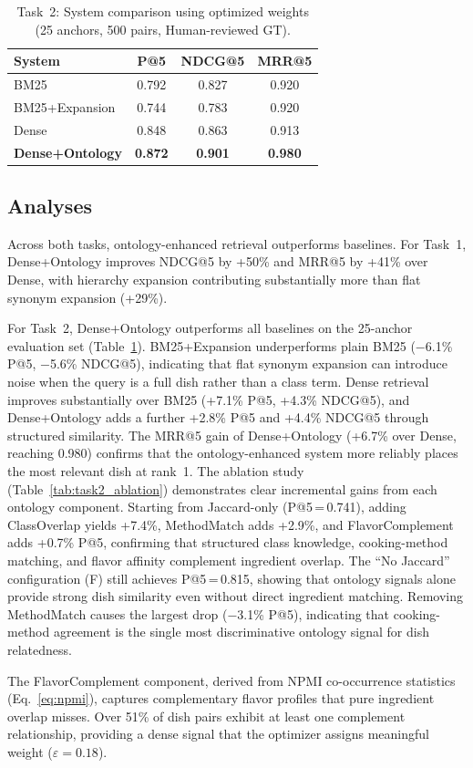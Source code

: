 \begin{table}[t]
\centering
\caption{Task~2: System comparison using optimized weights (25 anchors, 500 pairs, Human-reviewed GT).}
\label{tab:task2}
\begin{tabular}{lccc}
\toprule
\textbf{System} & \textbf{P@5} & \textbf{NDCG@5} & \textbf{MRR@5} \\
\midrule
BM25                         & 0.792 & 0.827 & 0.920 \\
BM25+Expansion               & 0.744 & 0.783 & 0.920 \\
Dense                        & 0.848 & 0.863 & 0.913 \\
\textbf{Dense+Ontology}      & \textbf{0.872} & \textbf{0.901} & \textbf{0.980} \\
\bottomrule
\end{tabular}
\end{table}

\subsection{Analyses}

Across both tasks, ontology-enhanced retrieval outperforms baselines. For Task~1, Dense+Ontology improves NDCG@5 by +50\% and MRR@5 by +41\% over Dense, with hierarchy expansion contributing substantially more than flat synonym expansion (+29\%).

For Task~2, Dense+Ontology outperforms all baselines on the 25-anchor evaluation set (Table~\ref{tab:task2}). BM25+Expansion underperforms plain BM25 ($-$6.1\% P@5, $-$5.6\% NDCG@5), indicating that flat synonym expansion can introduce noise when the query is a full dish rather than a class term. Dense retrieval improves substantially over BM25 (+7.1\% P@5, +4.3\% NDCG@5), and Dense+Ontology adds a further +2.8\% P@5 and +4.4\% NDCG@5 through structured similarity. The MRR@5 gain of Dense+Ontology (+6.7\% over Dense, reaching 0.980) confirms that the ontology-enhanced system more reliably places the most relevant dish at rank~1. The ablation study (Table~\ref{tab:task2_ablation}) demonstrates clear incremental gains from each ontology component. Starting from Jaccard-only (P@5\,=\,0.741), adding ClassOverlap yields +7.4\%, MethodMatch adds +2.9\%, and FlavorComplement adds +0.7\% P@5, confirming that structured class knowledge, cooking-method matching, and flavor affinity complement ingredient overlap. The ``No Jaccard'' configuration (F) still achieves P@5\,=\,0.815, showing that ontology signals alone provide strong dish similarity even without direct ingredient matching. Removing MethodMatch causes the largest drop ($-$3.1\% P@5), indicating that cooking-method agreement is the single most discriminative ontology signal for dish relatedness.

The FlavorComplement component, derived from NPMI co-occurrence statistics (Eq.~\ref{eq:npmi}), captures complementary flavor profiles that pure ingredient overlap misses. Over 51\% of dish pairs exhibit at least one complement relationship, providing a dense signal that the optimizer assigns meaningful weight ($\varepsilon = 0.18$).